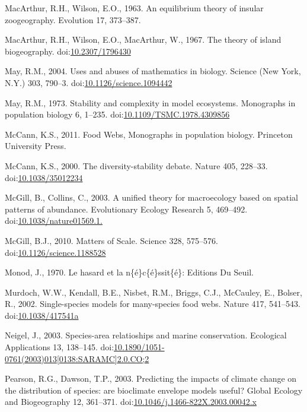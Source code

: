 \hypertarget{ref-MacArthur1963}{}
MacArthur, R.H., Wilson, E.O., 1963. An equilibrium theory of insular
zoogeography. Evolution 17, 373--387.

\hypertarget{ref-MacArthur1967a}{}
MacArthur, R.H., Wilson, E.O., MacArthur, W., 1967. The theory of island
biogeography.
doi:\href{https://doi.org/10.2307/1796430}{10.2307/1796430}

\hypertarget{ref-May2004}{}
May, R.M., 2004. Uses and abuses of mathematics in biology. Science (New
York, N.Y.) 303, 790--3.
doi:\href{https://doi.org/10.1126/science.1094442}{10.1126/science.1094442}

\hypertarget{ref-May1973}{}
May, R.M., 1973. Stability and complexity in model ecosystems.
Monographs in population biology 6, 1--235.
doi:\href{https://doi.org/10.1109/TSMC.1978.4309856}{10.1109/TSMC.1978.4309856}

\hypertarget{ref-mccann2011food}{}
McCann, K.S., 2011. Food Webs, Monographs in population biology.
Princeton University Press.

\hypertarget{ref-McCann2000}{}
McCann, K.S., 2000. The diversity-stability debate. Nature 405, 228--33.
doi:\href{https://doi.org/10.1038/35012234}{10.1038/35012234}

\hypertarget{ref-McGill2003}{}
McGill, B., Collins, C., 2003. A unified theory for macroecology based
on spatial patterns of abundance. Evolutionary Ecology Research 5,
469--492.
doi:\href{https://doi.org/10.1038/nature01569.1.}{10.1038/nature01569.1.}

\hypertarget{ref-McGill2010}{}
McGill, B.J., 2010. Matters of Scale. Science 328, 575--576.
doi:\href{https://doi.org/10.1126/science.1188528}{10.1126/science.1188528}

\hypertarget{ref-monod1970hasard}{}
Monod, J., 1970. Le hasard et la n\{é\}c\{é\}ssit\{é\}: Editions Du
Seuil.

\hypertarget{ref-Murdoch2002}{}
Murdoch, W.W., Kendall, B.E., Nisbet, R.M., Briggs, C.J., McCauley, E.,
Bolser, R., 2002. Single-species models for many-species food webs.
Nature 417, 541--543.
doi:\href{https://doi.org/10.1038/417541a}{10.1038/417541a}

\hypertarget{ref-Neigel2003}{}
Neigel, J., 2003. Species-area relatioships and marine conservation.
Ecological Applications 13, 138--145.
doi:\href{https://doi.org/10.1890/1051-0761(2003)013\%5B0138:SARAMC\%5D2.0.CO;2}{10.1890/1051-0761(2003)013{[}0138:SARAMC{]}2.0.CO;2}

\hypertarget{ref-Pearson2003}{}
Pearson, R.G., Dawson, T.P., 2003. Predicting the impacts of climate
change on the distribution of species: are bioclimate envelope models
useful? Global Ecology and Biogeography 12, 361--371.
doi:\href{https://doi.org/10.1046/j.1466-822X.2003.00042.x}{10.1046/j.1466-822X.2003.00042.x}

